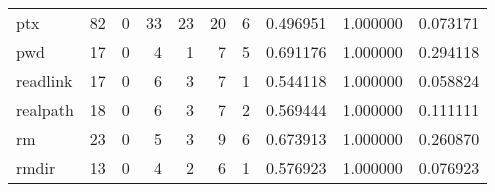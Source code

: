 \begin{longtable}{lrrrrrrrrr}
ptx       &                                       82 &                                                  0 &                                                 33 &                                                 23 &                                                 20 &                                                  6 &                                           0.496951 &                               1.000000 &                             0.073171 \\
pwd       &                                       17 &                                                  0 &                                                  4 &                                                  1 &                                                  7 &                                                  5 &                                           0.691176 &                               1.000000 &                             0.294118 \\
readlink  &                                       17 &                                                  0 &                                                  6 &                                                  3 &                                                  7 &                                                  1 &                                           0.544118 &                               1.000000 &                             0.058824 \\
realpath  &                                       18 &                                                  0 &                                                  6 &                                                  3 &                                                  7 &                                                  2 &                                           0.569444 &                               1.000000 &                             0.111111 \\
rm        &                                       23 &                                                  0 &                                                  5 &                                                  3 &                                                  9 &                                                  6 &                                           0.673913 &                               1.000000 &                             0.260870 \\
rmdir     &                                       13 &                                                  0 &                                                  4 &                                                  2 &                                                  6 &                                                  1 &                                           0.576923 &                               1.000000 &                             0.076923 \\

\end{longtable}
